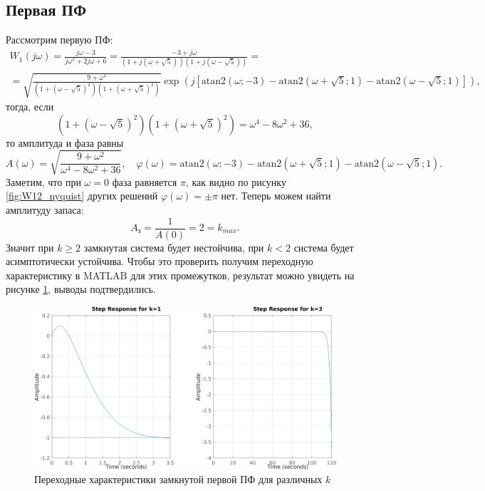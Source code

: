 \subsection{Первая ПФ}
Рассмотрим первую ПФ:
\begin{equation*}
    \begin{split}
    W_1(j\omega)=\frac{j\omega-3}{j\omega^2+2j\omega+6}
    =\frac{-3+j\omega}{(1+j(\omega+\sqrt{5}))(1+j(\omega-\sqrt{5}))}=\\
    =\sqrt{\frac{9+\omega^2}{(1+(\omega-\sqrt{5})^2)(1+(\omega+\sqrt{5})^2)}}
    \exp \left( j\left[ \text{atan2}(\omega;-3) - \text{atan2}(\omega+\sqrt 5;1) - \text{atan2}(\omega-\sqrt 5;1) \right] \right),
    \end{split}
\end{equation*}
тогда, если 
\begin{equation*}
    (1+(\omega-\sqrt{5})^2)(1+(\omega+\sqrt{5})^2)=\omega^4-8\omega^2+36,
\end{equation*}
то амплитуда и фаза равны
\begin{equation*}
    A(\omega)=\sqrt{\frac{9+\omega^2}{\omega^4-8\omega^2+36}},
    \quad \varphi(\omega)=\text{atan2}(\omega;-3) - \text{atan2}(\omega+\sqrt 5;1) - \text{atan2}(\omega-\sqrt 5;1).
\end{equation*}
Заметим, что при $\omega=0$ фаза равняется $\pi$, как видно по рисунку \ref{fig:W12_nyquist}
других решений $\varphi(\omega)=\pm\pi$ нет. Теперь можем найти амплитуду запаса:
\begin{equation*}
    A_\text{з}=\frac{1}{A(0)}=2=k_{max}.
\end{equation*}
Значит при $k\geq 2$ замкнутая система будет нестойчива, при $k<2$ система будет
асимптотически устойчива. Чтобы это проверить получим переходную характеристику
в MATLAB для этих промежутков, результат можно увидеть на рисунке \ref{fig:W1_step},
выводы подтвердились.

\begin{figure}[H]
    \centering
    \includegraphics[width=\textwidth]{figs/task_2_W1_ksteps.png}
    \caption{Переходные характеристики замкнутой первой ПФ для различных $k$}
    \label{fig:W1_step}
\end{figure}

